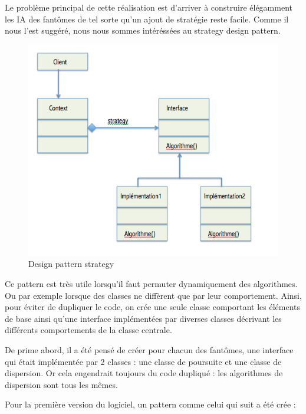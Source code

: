 \documentclass[a4paper,12pt]{report} %
\begin{document}
Le problème principal de cette réalisation est d'arriver à construire élégamment les IA des fantômes de tel sorte qu'un ajout de stratégie reste facile.
Comme il nous l'est suggéré, nous nous sommes intéréssées au strategy design pattern.

\begin{figure}[!h] %
		\centering
		\includegraphics[scale=0.7]{ressources/StrategyDesignPattern.png}
		\caption{Design pattern strategy}
\end{figure} 



Ce pattern est très utile lorsqu'il faut permuter dynamiquement des algorithmes.
Ou par exemple lorsque des classes ne diffèrent que par leur comportement. Ainsi, pour éviter de dupliquer le code, on crée une seule classe comportant les éléments de base ainsi qu'une interface implémentées par diverses classes décrivant les différents comportements de la classe centrale.

De prime abord, il a été pensé de créer pour chacun des fantômes, une interface qui était implémentée par 2 classes : une classe de poursuite et une classe de dispersion.
Or cela engendrait toujours du code dupliqué : les algorithmes de dispersion sont tous les mêmes.

Pour la première version du logiciel, un pattern comme celui qui suit a été crée :
\end{document}
